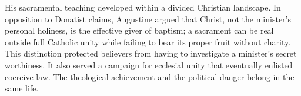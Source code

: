 His sacramental teaching developed within a divided Christian landscape. In
opposition to Donatist claims, Augustine argued that Christ, not the minister's
personal holiness, is the effective giver of baptism; a sacrament can be real
outside full Catholic unity while failing to bear its proper fruit without
charity. This distinction protected believers from having to investigate a
minister's secret worthiness. It also served a campaign for ecclesial unity
that eventually enlisted coercive law. The theological achievement and the
political danger belong in the same life.
